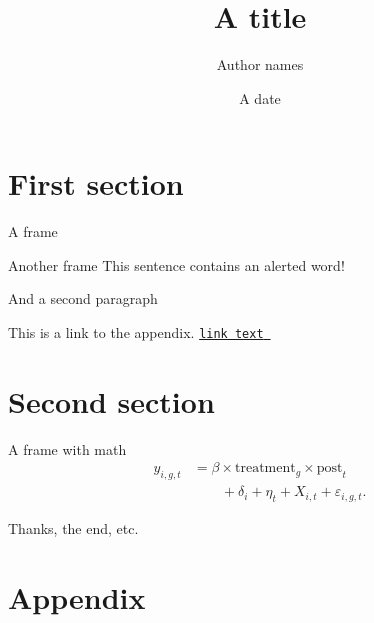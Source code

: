 \documentclass[aspectratio=169, 11pt]{beamer}
\title[Some title]{A title}
\author{Author names}
\date{A date}
\begin{document}
\maketitle

\section{First section}

\begin{frame}{A frame}
    
\end{frame}

\begin{frame}{Another frame}
    This sentence contains an \alert{alerted} word!\pause
    
    And a second paragraph\pause
    
    This is a link to the appendix. \hyperlink{app_example}{\texttt{link text}~ }
\end{frame}

\section{Second section}

\begin{frame}{A frame with math}
    \begin{equation}
    \begin{aligned}
        y_{i,g,t} &= \beta \times \text{treatment}_g \times \text{post}_t \\
        &\qquad + \delta_i + \eta_t + X_{i,t} + \varepsilon_{i,g,t}.
    \end{aligned}
    \end{equation}
\end{frame}

\begin{frame}
    \begin{center}
        \LARGE Thanks, the end, etc.
    \end{center}
\end{frame}

\AtBeginSection[]{}
\section{Appendix}

\appendix
\end{document}
